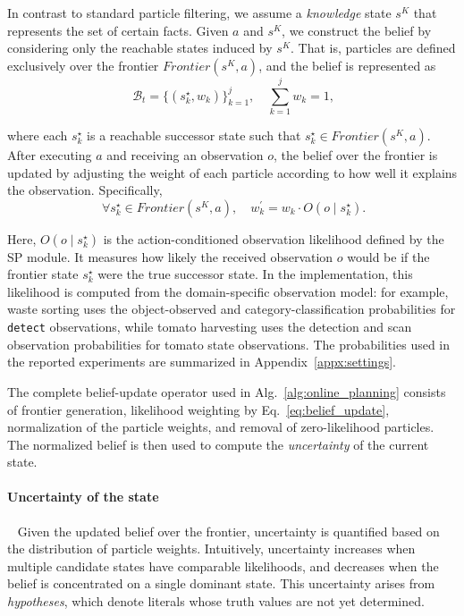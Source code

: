 In contrast to standard particle filtering, we assume a \textit{knowledge} state $s^{K}$ that represents the set of certain facts. Given $a$ and $s^{K}$, we construct the belief by considering only the reachable states induced by $s^{K}$. That is, particles are defined exclusively over the frontier $Frontier(s^{K}, a)$, and the belief is represented as
\begin{equation}~\label{eq:transition_belief}
\mathcal{B}_t = \{ (s_k^{\star}, w_k) \}_{k=1}^{j}, \quad \sum_{k=1}^{j} w_k = 1,
\end{equation}

where each $s_k^{\star}$ is a reachable successor state such that $s_k^{\star} \in Frontier(s^{K}, a)$.
After executing $a$ and receiving an observation $o$, the belief over the frontier is updated by adjusting the weight of each particle according to how well it explains the observation. Specifically, 
\begin{equation}~\label{eq:belief_update}
\forall s_k^{\star} \in Frontier(s^{K}, a), \quad
w_k^\prime = w_k \cdot O(o \mid s_k^{\star}).\end{equation}

Here, $O(o \mid s_k^{\star})$ is the action-conditioned observation likelihood defined by the SP module. It measures how likely the received observation $o$ would be if the frontier state $s_k^{\star}$ were the true successor state. In the implementation, this likelihood is computed from the domain-specific observation model: for example, waste sorting uses the object-observed and category-classification probabilities for \texttt{detect} observations, while tomato harvesting uses the detection and scan observation probabilities for tomato state observations. The probabilities used in the reported experiments are summarized in Appendix~\ref{appx:settings}.

The complete belief-update operator used in Alg.~\ref{alg:online_planning} consists of frontier generation, likelihood weighting by Eq.~\ref{eq:belief_update}, normalization of the particle weights, and removal of zero-likelihood particles. The normalized belief is then used to compute the \textit{uncertainty} of the current state.


\paragraph{Uncertainty of the state}~\label{method:uncertainty}
Given the updated belief over the frontier, uncertainty is quantified based on the distribution of particle weights. Intuitively, uncertainty increases when multiple candidate states have comparable likelihoods, and decreases when the belief is concentrated on a single dominant state. This uncertainty arises from \textit{hypotheses}, which denote literals whose truth values are not yet determined.

